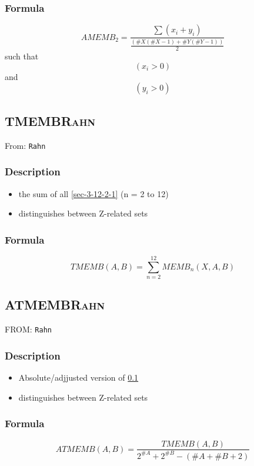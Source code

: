 \documentclass[11pt]{article}
\begin{document}
\subsubsection{Formula}
\label{sec-3-13-2}
$$ AMEMB_{2}=\frac{\sum \left( x_{i}+y_{i} \right)}{\frac{\left(\#X\left(\#X-1\right)+\#Y\left(\#Y-1\right)\right)}{2}} $$
such that $$ \left(x_{i}>0\right) $$ and $$ \left(y_{i}>0\right) $$

\subsection{TMEMB\hfill{}\textsc{Rahn}}
\label{sec-3-14}
From: \texttt{Rahn}
\subsubsection{Description}
\label{sec-3-14-1}
\begin{itemize}
\item the sum of all \ref{sec-3-12-2-1} (n = 2 to 12)
\item distinguishes between Z-related sets
\end{itemize}

\subsubsection{Formula}
\label{sec-3-14-2}
$$ TMEMB \left( A,B \right) = \sum_{n=2}^{12}MEMB_{n}\left( X,A,B \right) $$

\subsection{ATMEMB\hfill{}\textsc{Rahn}}
\label{sec-3-15}
FROM: \texttt{Rahn}
\subsubsection{Description}
\label{sec-3-15-1}
\begin{itemize}
\item Absolute/adjjusted version of \ref{sec-3-14}
\item distinguishes between Z-related sets
\end{itemize}

\subsubsection{Formula}
\label{sec-3-15-2}

$$ ATMEMB\left(A,B\right)=\frac{TMEMB\left(A,B\right)}{2^{\#A}+2^{\#B}-\left(\#A+\#B+2\right)} $$
\end{document}
